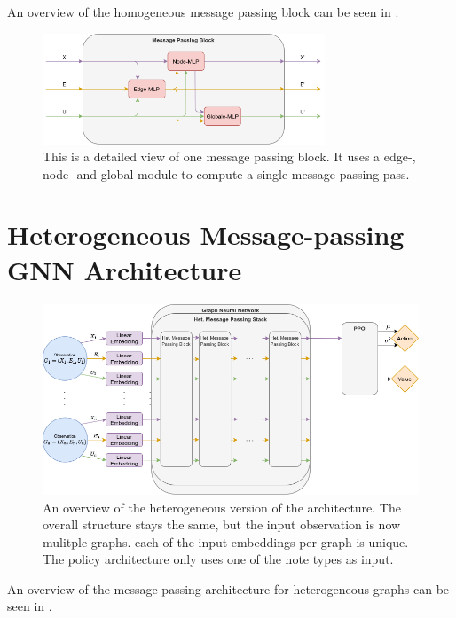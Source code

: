 An overview of the homogeneous message passing block can be seen in .

\begin{figure}[htp]
    \centering
    \includegraphics[width=0.75\textwidth]{figures/message_passing_block.png}
    \hspace{1cm}   
    \caption{This is a detailed view of one message passing block. It uses a edge-, node- and global-module to compute a single message passing pass.}
    \label{fig:message_passing_block}
\end{figure}



\section{Heterogeneous Message-passing GNN Architecture}
\begin{figure}[htp]
    \centering
    \includegraphics[width=1.0\textwidth]{figures/heterogeneous_gnn.png}
    \hspace{1cm}   
    \caption{An overview of the heterogeneous version of the architecture. The overall structure stays the same, but the input observation is now mulitple graphs. each of the input embeddings per graph is unique. The policy architecture only uses one of the note types as input.}
    \label{fig:heterogeneous_gnn}
\end{figure}

An overview of the message passing architecture for heterogeneous graphs can be seen in .

